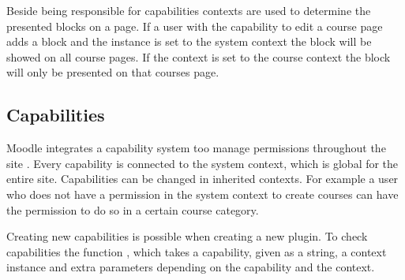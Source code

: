 Beside being responsible for capabilities contexts are used to determine the presented blocks on a page.
If a user with the capability to edit a course page adds a block and the instance is set to the system context the block will be showed on all course pages.
If the context is set to the course context the block will only be presented on that courses page. 

	
\subsection{Capabilities}
\label{sub:capabilities}
Moodle integrates a capability system too manage permissions throughout the site \cite{moodlerolesandmodules}. 
Every capability is connected to the system context, which is global for the entire site. 
Capabilities can be changed in inherited contexts. 
For example a user who does not have a permission in the system context to create courses can have the permission to do so in a certain course category. 

Creating new capabilities is possible when creating a new plugin. 
To check capabilities the function , which takes a capability, given as a string, a context instance and extra parameters depending on the capability and the context. 


	